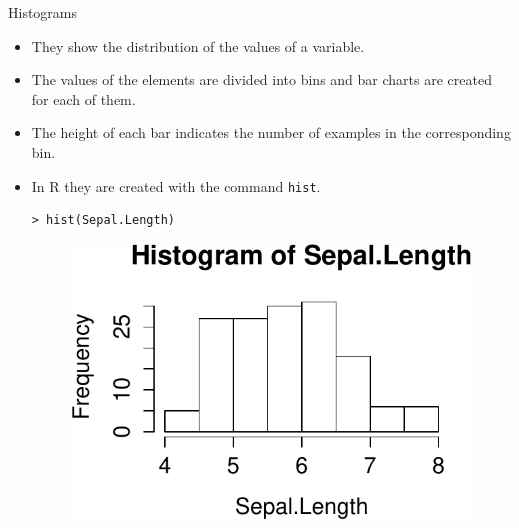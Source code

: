 \documentclass[handout]{beamer}
\begin{document}
\begin{frame}[fragile]{Histograms}
\scriptsize{
\begin{itemize}
 \item They show the distribution of the values of a variable.
 \item The values of the elements are divided into bins and bar charts are created for each of them.
 \item The height of each bar indicates the number of examples in the corresponding bin.
 \item In R they are created with the command \verb+hist+.
 \begin{verbatim}
> hist(Sepal.Length)
 \end{verbatim}
 \begin{figure}[h!]
	\centering
	\includegraphics[scale=0.6]{pics/hist1.pdf}
	
	
\end{figure} 

\end{itemize}




}
\end{frame}
\end{document}
